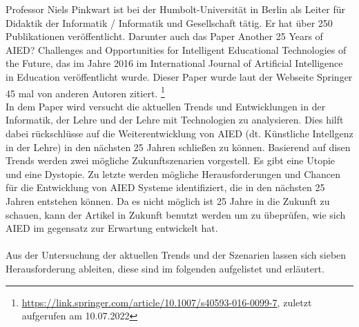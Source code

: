 
Professor Niels Pinkwart ist bei der Humbolt-Universität in Berlin als Leiter für \glqq{}Didaktik der Informatik / Informatik und Gesellschaft\grqq{} tätig. 
Er hat über 250 Publikationen veröffentlicht. Darunter auch das Paper \glqq{}Another 25 Years of AIED? Challenges and Opportunities for Intelligent Educational Technologies of the Future\grqq{}, das im Jahre 2016 im \glqq International Journal of Artificial Intelligence in Education\grqq{} veröffentlicht wurde.
Dieser Paper wurde laut der Webseite Springer 45 mal von anderen Autoren zitiert. \footnote{\url{https://link.springer.com/article/10.1007/s40593-016-0099-7}, zuletzt aufgerufen am 10.07.2022}
\\ \noindent
In dem Paper wird versucht die aktuellen Trends und Entwicklungen in der Informatik, der Lehre und der Lehre mit Technologien zu analysieren. Dies hilft dabei rückschlüsse auf die Weiterentwicklung
von \ac{AIED} (dt. Künstliche Intellgenz in der Lehre) in den nächsten 25 Jahren schließen zu können. Basierend auf disen Trends werden zwei mögliche Zukunftszenarien vorgestell.
Es gibt eine Utopie und eine Dystopie. Zu letzte werden mögliche Herausforderungen und Chancen für die Entwicklung von \ac{AIED} Systeme identifiziert, die in den nächsten 25 Jahren entstehen können. 
Da es nicht möglich ist 25 Jahre in die Zukunft zu schauen, kann der Artikel in Zukunft benutzt werden um zu übeprüfen, wie sich \ac{AIED} im gegensatz zur Erwartung entwickelt hat. \cite[S. 1f]{Pinkwart.2016}
\\ \noindent
\\ \noindent
Aus der Untersuchung der aktuellen Trends und der Szenarien lassen sich sieben Herausforderung ableiten, diese sind im folgenden aufgelistet und erläutert.
